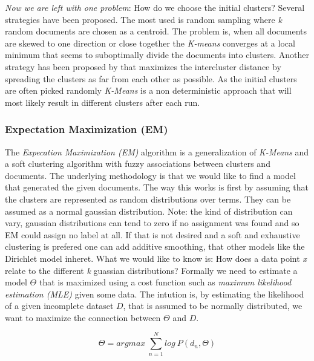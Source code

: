     \emph{Now we are left with one problem}: How do we choose the initial clusters? Several strategies have been proposed. The most used is random sampling where \emph{k} random documents are chosen as a centroid. The problem is, when all documents are skewed to one direction or close together the \emph{K-means} converges at a local minimum that seems to suboptimally divide the documents into clusters.
    Another strategy has been proposed by \cite{KMeansPlusPlus2007} that maximizes the intercluster distance by spreading the clusters as far from each other as possible. 
    As the initial clusters are often picked randomly \emph{K-Means} is a non deterministic approach that will most likely result in different clusters after each run.

    \subsubsection{Expectation Maximization (EM)}
    \label{sec:em}

    The \emph{Expecation Maximization (EM)} algorithm is a generalization of \emph{K-Means} and a soft clustering algorithm with fuzzy associations between clusters and documents. The underlying methodology is that we would like to find a model that generated the given documents. The way this works is first by assuming that the clusters are represented as random distributions over terms. They can be assumed as a normal gaussian distribution. Note: the kind of distribution can vary, gaussian distributions can tend to zero if no assignment was found and so EM could assign no label at all. If that is not desired and a soft and exhaustive clustering is prefered one can add additive smoothing, that other models like the Dirichlet model inheret. What we would like to know is: How does a data point \emph{x} relate to the different \emph{k} guassian distributions? Formally we need to estimate a model $\Theta$ that is maximized using a cost function such as \emph{maximum likelihood estimation (MLE)} given some data. The intution is, by estimating the likelihood of a given incomplete dataset $D$, that is assumed to be normally distributed, we want to maximize the connection between $\Theta$ and $D$.

      \begin{equation}
        \Theta = argmax\:\sum_{n=1}^{N}log\:P(d_n,\Theta)
      \end{equation}

